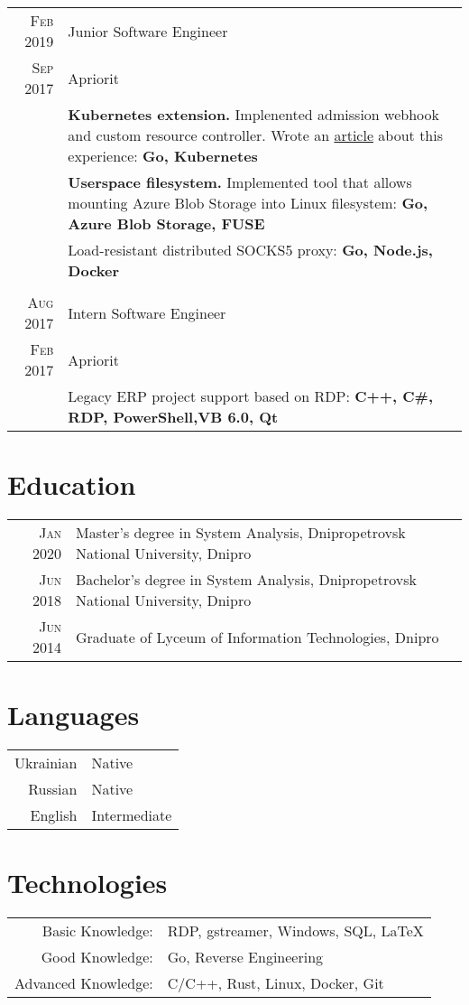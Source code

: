 \documentclass[a4paper,10pt]{article}
\begin{document}
\begin{tabular}{r|p{14cm}}
\textsc{Feb} 2019   & Junior Software Engineer \\
\textsc{Sep} 2017   & Apriorit \\

                    & \footnotesize{\textbf{Kubernetes extension.} Implenented admission webhook and custom resource controller. Wrote an \href{https://www.apriorit.com/dev-blog/624-web-crd-in-kubernetes}{article} about this experience: \textbf{Go, Kubernetes}} \\
					& \footnotesize{\textbf{Userspace filesystem.} Implemented tool that allows mounting Azure Blob Storage into Linux filesystem: \textbf{Go, Azure Blob Storage, FUSE}} \\
                    & \footnotesize{Load-resistant distributed SOCKS5 proxy: \textbf{Go, Node.js, Docker}} \\

\multicolumn{2}{c}{} \\

\textsc{Aug} 2017   & Intern Software Engineer \\
\textsc{Feb} 2017   & Apriorit \\

                    & \footnotesize{Legacy ERP project support based on RDP: \textbf{C++, C\#, RDP, PowerShell,VB 6.0, Qt}} \\                
\end{tabular}

\section{Education}
\begin{tabular}{r|l}    
\textsc{Jan} 2020   & \footnotesize{Master’s degree in System Analysis, Dnipropetrovsk National University, Dnipro} \\
\textsc{Jun} 2018   & \footnotesize{Bachelor’s degree in System Analysis, Dnipropetrovsk National University, Dnipro} \\
\textsc{Jun} 2014   & \footnotesize{Graduate of Lyceum of Information Technologies, Dnipro} \\
\end{tabular}

\section{Languages}  
\begin{tabular}{r|l}
Ukrainian           & \footnotesize{Native} \\
Russian             & \footnotesize{Native} \\
English             & \footnotesize{Intermediate} \\
\end{tabular}

\section{Technologies}  
\begin{tabular}{rl}
Basic Knowledge:    & \footnotesize{RDP, gstreamer, Windows, SQL, \LaTeX} \\
Good Knowledge:     & \footnotesize{Go, Reverse Engineering} \\
Advanced Knowledge: & \footnotesize{C/C++, Rust, Linux, Docker, Git} \\
\end{tabular}
\end{document}
